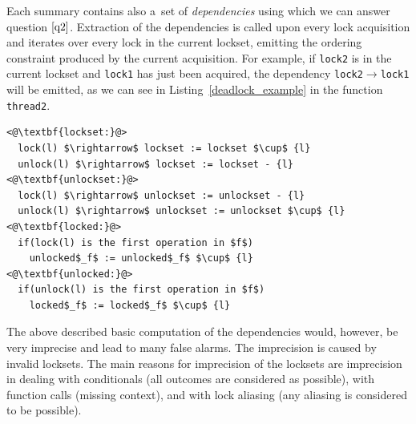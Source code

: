 \documentclass{ExcelAtFIT}
\begin{document}
Each summary contains also a~set of \textit{dependencies} using which we can answer question $\ref{q2}$. Extraction of the dependencies is called upon every lock acquisition and iterates over every lock in the current lockset, emitting the ordering constraint produced by the current acquisition. For example, if \texttt{lock2} is in the current lockset and \texttt{lock1} has just been acquired, the dependency \texttt{lock2$\rightarrow$lock1} will be emitted, as we can see in Listing~\ref{deadlock_example} in the function \texttt{thread2}.
\begin{lstlisting}[mathescape=true, keywordstyle=\ttfamily, float=tp, belowskip=-1 \baselineskip, label={summary_rules}, caption=Rules for summary computation ]
<@\textbf{lockset:}@>
  lock(l) $\rightarrow$ lockset := lockset $\cup$ {l}
  unlock(l) $\rightarrow$ lockset := lockset - {l}
<@\textbf{unlockset:}@>
  lock(l) $\rightarrow$ unlockset := unlockset - {l}
  unlock(l) $\rightarrow$ unlockset := unlockset $\cup$ {l}
<@\textbf{locked:}@>
  if(lock(l) is the first operation in $f$)
    unlocked$_f$ := unlocked$_f$ $\cup$ {l}
<@\textbf{unlocked:}@>
  if(unlock(l) is the first operation in $f$)
    locked$_f$ := locked$_f$ $\cup$ {l}
\end{lstlisting}


The above described basic computation of the dependencies would, however, be very imprecise and lead to many false alarms. The imprecision is caused by invalid locksets. The main reasons for imprecision of the locksets are imprecision in dealing with conditionals (all outcomes are considered as possible), with function calls (missing context), and with lock aliasing (any aliasing is considered to be possible).



\end{document}
